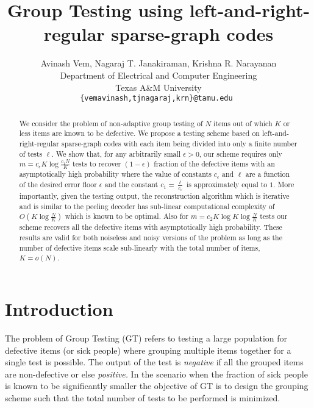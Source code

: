 \documentclass[conference,twocolumn]{IEEEtran}
\def\ceps{c_{\epsilon}}
\begin{document}
\title{Group Testing using left-and-right-regular sparse-graph codes}
\author{Avinash Vem, Nagaraj T. Janakiraman, Krishna R. Narayanan\\
Department of Electrical and Computer Engineering \\
Texas A\&M University\\
{\tt\small {\{vemavinash,tjnagaraj,krn\}@tamu.edu} }}

\maketitle
\begin{abstract} 
We consider the problem of non-adaptive group testing of $N$ items out of which $K$ or less items are known to be defective. We propose a testing scheme based on left-and-right-regular sparse-graph codes with each item being divided into only a finite number of tests $\ell$. We show that, for any arbitrarily small $\epsilon>0$, our scheme requires only $m=\ceps K\log \frac{c_1N}{K}$ tests to recover $(1-\epsilon)$ fraction of the defective items with an asymptotically high probability where the value of constants $\ceps$ and $\ell$ are a function of the desired error floor $\epsilon$  and the constant $c_1=\frac{\ell}{\ceps}$ is approximately equal to $1$. More importantly, given the testing output, the reconstruction algorithm which is iterative and is similar to the peeling decoder has sub-linear computational complexity of $O(K\log \frac{N}{K})$ which is known to be optimal. Also for $m=c_2 K\log K\log \frac{N}{K}$ tests our scheme recovers all the defective items with asymptotically high probability. These results are valid for both noiseless and noisy versions of the problem as long as the number of defective items scale sub-linearly with the total number of items, $K= o(N)$.
\end{abstract}

\section{Introduction}
The problem of Group Testing (GT) refers to testing a large population for defective items (or sick people) where grouping multiple items together for a single test is possible. The output of the test is \textit{negative} if all the grouped items are non-defective or else \textit{positive.} In the scenario when the fraction of sick people is known to be significantly smaller the objective of GT is to design the grouping scheme such that the total number of tests to be performed is minimized. 
\end{document}
